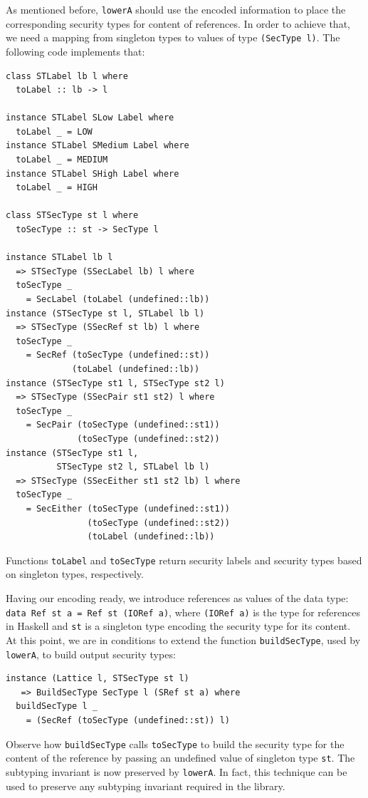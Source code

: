 \documentclass[times, 10pt,twocolumn]{article}
\begin{document}
As mentioned before, \texttt{lowerA} should use the encoded 
information to place the corresponding 
security types for content of references. 
In order to achieve that, we need a mapping 
from singleton types to values
of type \texttt{(SecType l)}. The following code implements that: 

\begin{Verbatim}[fontsize=\footnotesize]
class STLabel lb l where
  toLabel :: lb -> l

instance STLabel SLow Label where
  toLabel _ = LOW
instance STLabel SMedium Label where
  toLabel _ = MEDIUM
instance STLabel SHigh Label where
  toLabel _ = HIGH

class STSecType st l where
  toSecType :: st -> SecType l

instance STLabel lb l 
  => STSecType (SSecLabel lb) l where
  toSecType _ 
    = SecLabel (toLabel (undefined::lb))
instance (STSecType st l, STLabel lb l)
  => STSecType (SSecRef st lb) l where
  toSecType _  
    = SecRef (toSecType (undefined::st)) 
             (toLabel (undefined::lb))
instance (STSecType st1 l, STSecType st2 l)
  => STSecType (SSecPair st1 st2) l where
  toSecType _  
    = SecPair (toSecType (undefined::st1)) 
              (toSecType (undefined::st2))
instance (STSecType st1 l, 
          STSecType st2 l, STLabel lb l)
  => STSecType (SSecEither st1 st2 lb) l where
  toSecType _ 
    = SecEither (toSecType (undefined::st1)) 
                (toSecType (undefined::st2)) 
                (toLabel (undefined::lb))
\end{Verbatim}
Functions \texttt{toLabel} and \texttt{toSecType} return  
security labels and security types based on singleton types, respectively. 

Having our encoding ready, we introduce references as values of the 
data type: 
\texttt{data Ref st a = Ref st (IORef a)},
where \texttt{(IORef a)} is the type for references in Haskell and \texttt{st} is a
singleton type encoding the security type 
for its content. At this point, we are in conditions to extend the
function \texttt{buildSecType}, used by \texttt{lowerA},
to build output security types: 
\begin{Verbatim}[fontsize=\footnotesize]
instance (Lattice l, STSecType st l) 
   => BuildSecType SecType l (SRef st a) where
  buildSecType l _  
    = (SecRef (toSecType (undefined::st)) l)
\end{Verbatim}
Observe how \texttt{buildSecType} calls \texttt{toSecType} 
to build the security type for the content of the reference 
by passing an undefined value of singleton type \texttt{st}.
The subtyping invariant is now preserved by \texttt{lowerA}. 
In fact, this technique can be used to preserve any subtyping 
invariant required in the library.
\end{document}
